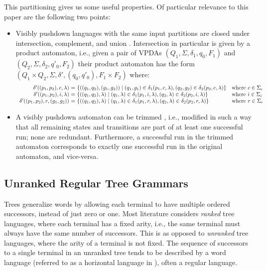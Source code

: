 \documentclass[acmsmall,review,anonymous]{acmart}\settopmatter{printfolios=true,printccs=false,printacmref=false}
\newcommand{\T}{\Sigma} %
\begin{document}
This partitioning gives us some useful properties. Of particular relevance to this paper are the following two points:

\begin{itemize}
\item Visibly pushdown languages with the same input partitions are closed under intersection, complement, and union \cite{alurVisiblyPushdownLanguages2004}. Intersection in particular is given by a product automaton, i.e., given a pair of VPDAs $(Q_1, \T, \delta_1, q_0, F_1)$ and $(Q_2, \T, \delta_2, q'_0, F_2)$ their product automaton has the form $(Q_1 \times Q_2, \T, \delta', (q_0, q'_0), F_1 \times F_2)$ where:
  $$
  \begin{array}{r@{\ =\ }ll}
    \delta'((p_1, p_2), c, \lambda) & \{((q_1, q_2), (g_1, g_2)) \mid (q_1, g_1) \in \delta_1(p_1, c, \lambda), (q_2, g_2) \in \delta_2(p_2, c, \lambda) \} & \text{where } c \in \T_c \\
    \delta'((p_1, p_2), i, \lambda) & \{((q_1, q_2), \lambda) \mid (q_1, \lambda) \in \delta_1(p_1, i, \lambda), (q_2, \lambda) \in \delta_2(p_2, i, \lambda) \} & \text{where } i \in \T_i \\
    \delta'((p_1, p_2), r, (g_1, g_2)) & \{((q_1, q_2), \lambda) \mid (q_1, \lambda) \in \delta_1(p_1, r, \lambda), (q_2, \lambda) \in \delta_2(p_2, r, \lambda) \} & \text{where } r \in \T_r \\
  \end{array}
  $$

\item A visibly pushdown automaton can be trimmed \cite{caralpTrimmingVisiblyPushdown2015}, i.e., modified in such a way that all remaining states and transitions are part of at least one successful run; none are redundant. Furthermore, a successful run in the trimmed automaton corresponds to exactly one successful run in the original automaton, and vice-versa.
\end{itemize}

\subsection{Unranked Regular Tree Grammars} \label{sec:preliminaries-trees}

Trees generalize words by allowing each terminal to have multiple ordered successors, instead of just zero or one. Most literature considers \emph{ranked} tree languages, where each terminal has a fixed arity, i.e., the same terminal must always have the same number of successors. This is as opposed to \emph{unranked} tree languages, where the arity of a terminal is not fixed. The sequence of successors to a single terminal in an unranked tree tends to be described by a word language (referred to as a horizontal language in \cite{comonTreeAutomataTechniques2007}), often a regular language.
\end{document}
